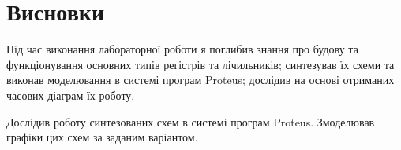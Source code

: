 \documentclass{article}
\begin{document}
\begin{normalsize}
	\begin{figure}[H]
		\centering
	\end{figure}

	\section*{Висновки}
	Під час виконання лабораторної роботи я поглибив знання про будову та функціонування основних типів регістрів та лічильників; синтезував їх схеми та виконав моделювання в системі програм Proteus; дослідив на основі отриманих часових діаграм їх роботу. 
	
	Дослідив роботу синтезованих схем в системі програм Proteus. Змоделював графіки цих схем за заданим варіантом.
	    
\end{normalsize}
\end{document}
